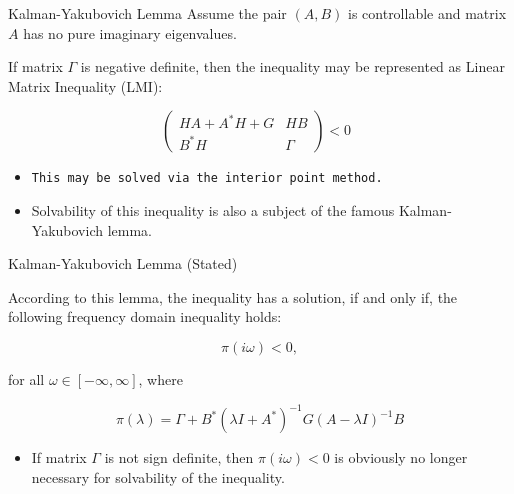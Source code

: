 \begin{frame}{Kalman-Yakubovich Lemma}
Assume the pair $(A,B)$ is controllable and matrix $A$ has no pure imaginary eigenvalues.
 \begin{block}{}
If matrix $\Gamma $ is negative definite, then the inequality may be represented as
Linear Matrix Inequality (LMI):

\begin{equation*}
\left(\begin{array}{cc}
HA + A^{*}H + G&HB \\
 B^{*}H&\Gamma \end{array}\right)  < 0 \; \;
\end{equation*}

\end{block}

\begin{itemize}

\item \texttt{This may be solved via the interior point method.}
 
 
\item Solvability of this inequality is also a subject of the famous Kalman-Yakubovich 
lemma.
 \end{itemize}   
 
 
 \end{frame} 
    
    
\begin{frame}{Kalman-Yakubovich Lemma (Stated)}

According to this lemma, the inequality has a solution, 
if and only if, the following frequency domain inequality holds:

\begin{equation*}
\pi (i\omega ) < 0,
\end{equation*}

\noindent for all $\omega \in [-\infty , \infty ]$, where

$$
\pi (\lambda ) = \Gamma  + B^{*}(\lambda I+A^{*})^{-1}G(A-\lambda I)^{-1}B
$$


\begin{itemize}
\item If matrix $\Gamma $ is not sign definite, then $\pi (i\omega ) < 0$ is obviously no longer necessary for solvability of the inequality.
\end{itemize}


\end{frame}     

